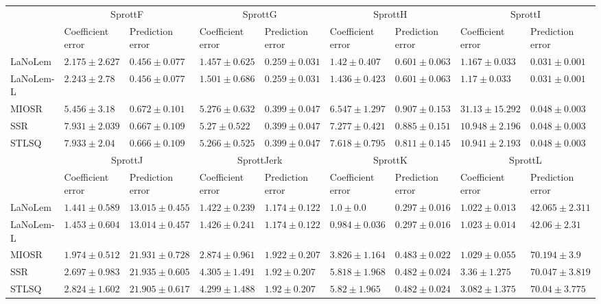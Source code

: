 \begin{table*}
{\begin{tabular}{lllllllll}
\midrule

 & \multicolumn{2}{c}{SprottF} & \multicolumn{2}{c}{SprottG} & \multicolumn{2}{c}{SprottH} & \multicolumn{2}{c}{SprottI} \\
 & Coefficient error & Prediction error & Coefficient error & Prediction error & Coefficient error & Prediction error & Coefficient error & Prediction error \\
\midrule
LaNoLem & $\mathbf{2.175}\pm 2.627$ & $0.456\pm 0.077$ & $\mathbf{1.457}\pm 0.625$ & $0.259\pm 0.031$ & $\mathbf{1.42}\pm 0.407$ & $0.601\pm 0.063$ & $\mathbf{1.167}\pm 0.033$ & $0.031\pm 0.001$ \\
LaNoLem-L & $2.243\pm 2.78$ & $\mathbf{0.456}\pm 0.077$ & $1.501\pm 0.686$ & $\mathbf{0.259}\pm 0.031$ & $1.436\pm 0.423$ & $\mathbf{0.601}\pm 0.063$ & $1.17\pm 0.033$ & $\mathbf{0.031}\pm 0.001$ \\
MIOSR & $5.456\pm 3.18$ & $0.672\pm 0.101$ & $5.276\pm 0.632$ & $0.399\pm 0.047$ & $6.547\pm 1.297$ & $0.907\pm 0.153$ & $31.13\pm 15.292$ & $0.048\pm 0.003$ \\
SSR & $7.931\pm 2.039$ & $0.667\pm 0.109$ & $5.27\pm 0.522$ & $0.399\pm 0.047$ & $7.277\pm 0.421$ & $0.885\pm 0.151$ & $10.948\pm 2.196$ & $0.048\pm 0.003$ \\
STLSQ & $7.933\pm 2.04$ & $0.666\pm 0.109$ & $5.266\pm 0.525$ & $0.399\pm 0.047$ & $7.618\pm 0.795$ & $0.811\pm 0.145$ & $10.941\pm 2.193$ & $0.048\pm 0.003$ \\

\midrule

 & \multicolumn{2}{c}{SprottJ} & \multicolumn{2}{c}{SprottJerk} & \multicolumn{2}{c}{SprottK} & \multicolumn{2}{c}{SprottL} \\
 & Coefficient error & Prediction error & Coefficient error & Prediction error & Coefficient error & Prediction error & Coefficient error & Prediction error \\
\midrule
LaNoLem & $\mathbf{1.441}\pm 0.589$ & $13.015\pm 0.455$ & $\mathbf{1.422}\pm 0.239$ & $1.174\pm 0.122$ & $1.0\pm 0.0$ & $0.297\pm 0.016$ & $\mathbf{1.022}\pm 0.013$ & $42.065\pm 2.311$ \\
LaNoLem-L & $1.453\pm 0.604$ & $\mathbf{13.014}\pm 0.457$ & $1.426\pm 0.241$ & $\mathbf{1.174}\pm 0.122$ & $\mathbf{0.984}\pm 0.036$ & $\mathbf{0.297}\pm 0.016$ & $1.023\pm 0.014$ & $\mathbf{42.06}\pm 2.31$ \\
MIOSR & $1.974\pm 0.512$ & $21.931\pm 0.728$ & $2.874\pm 0.961$ & $1.922\pm 0.207$ & $3.826\pm 1.164$ & $0.483\pm 0.022$ & $1.029\pm 0.055$ & $70.194\pm 3.9$ \\
SSR & $2.697\pm 0.983$ & $21.935\pm 0.605$ & $4.305\pm 1.491$ & $1.92\pm 0.207$ & $5.818\pm 1.968$ & $0.482\pm 0.024$ & $3.36\pm 1.275$ & $70.047\pm 3.819$ \\
STLSQ & $2.824\pm 1.602$ & $21.905\pm 0.617$ & $4.299\pm 1.488$ & $1.92\pm 0.207$ & $5.82\pm 1.965$ & $0.482\pm 0.024$ & $3.082\pm 1.375$ & $70.04\pm 3.775$ \\


\end{tabular}}
\end{table*}
